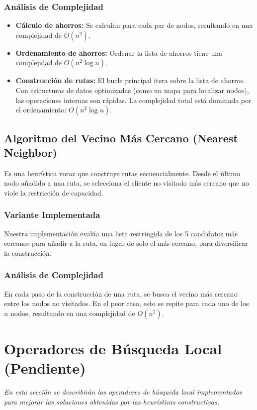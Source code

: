 \documentclass[a4paper,12pt]{article}
\begin{document}
\subsubsection{Análisis de Complejidad}
\begin{itemize}
    \item \textbf{Cálculo de ahorros:} Se calculan para cada par de nodos, resultando en una complejidad de $O(n^2)$.
    \item \textbf{Ordenamiento de ahorros:} Ordenar la lista de ahorros tiene una complejidad de $O(n^2 \log n)$.
    \item \textbf{Construcción de rutas:} El bucle principal itera sobre la lista de ahorros. Con estructuras de datos optimizadas (como un mapa para localizar nodos), las operaciones internas son rápidas. La complejidad total está dominada por el ordenamiento: $O(n^2 \log n)$.
\end{itemize}

\subsection{Algoritmo del Vecino Más Cercano (Nearest Neighbor)}
Es una heurística voraz que construye rutas secuencialmente. Desde el último nodo añadido a una ruta, se selecciona el cliente no visitado más cercano que no viole la restricción de capacidad.

\subsubsection{Variante Implementada}
Nuestra implementación evalúa una lista restringida de los 5 candidatos más cercanos para añadir a la ruta, en lugar de solo el más cercano, para diversificar la construcción.

\subsubsection{Análisis de Complejidad}
En cada paso de la construcción de una ruta, se busca el vecino más cercano entre los nodos no visitados. En el peor caso, esto se repite para cada uno de los $n$ nodos, resultando en una complejidad de $O(n^2)$.

\section{Operadores de Búsqueda Local (Pendiente)}
\textit{En esta sección se describirán los operadores de búsqueda local implementados para mejorar las soluciones obtenidas por las heurísticas constructivas.}
\end{document}
